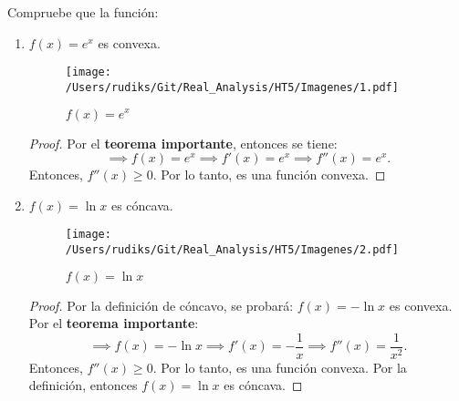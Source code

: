 Compruebe que la función: 
\begin{enumerate}
	\item $f(x)=e^x$ es convexa. 
	\begin{figure}[ht]
		\centering
		\texttt{[image: /Users/rudiks/Git/Real\_Analysis/HT5/Imagenes/1.pdf]}
		\caption{$f(x)=e^x$}
	\end{figure}

		\begin{proof}
		Por el \textbf{teorema importante}, entonces se tiene: 
		$$\implies f(x)=e^x \implies f'(x) =e^x \implies f''(x)= e^x.$$
		Entonces, $f''(x)\geq 0$. Por lo tanto, es una función convexa.
	\end{proof}



	\item $f(x)=\ln x$ es cóncava. 
		\begin{figure}[ht]
		\centering
		\texttt{[image: /Users/rudiks/Git/Real\_Analysis/HT5/Imagenes/2.pdf]}
		\caption{$f(x)=\ln x$}
	\end{figure}
		\begin{proof}
		Por la definición de cóncavo, se probará: $f(x)=-\ln x$ es convexa. Por el \textbf{teorema importante}:
		$$\implies f(x)=-\ln x\implies f'(x)=-\frac{1}{x}\implies f''(x)=\frac{1}{x^2}.$$
		Entonces, $f''(x)\geq 0$. Por lo tanto, es una función convexa. Por la definición, entonces $f(x)=\ln x$ es cóncava. 
	\end{proof}








\end{enumerate}
